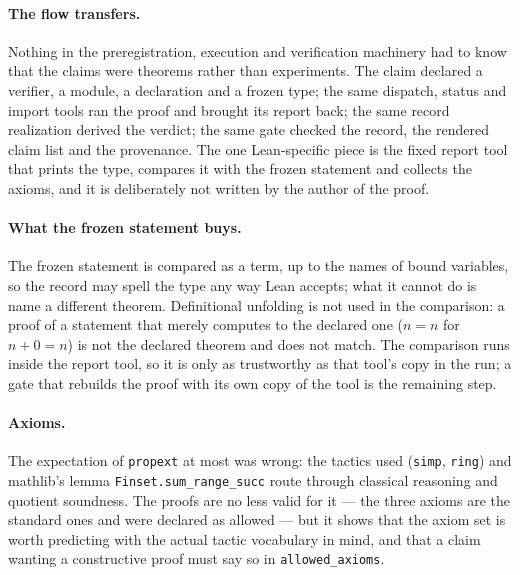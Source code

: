 \documentclass[journal,article,submit,pdftex,moreauthors]{Definitions/mdpi}
\begin{document}
\paragraph{The flow transfers.} Nothing in the preregistration, execution and verification machinery had to know that the claims were theorems rather than experiments. The claim declared a verifier, a module, a declaration and a frozen type; the same dispatch, status and import tools ran the proof and brought its report back; the same record realization derived the verdict; the same gate checked the record, the rendered claim list and the provenance. The one Lean-specific piece is the fixed report tool that prints the type, compares it with the frozen statement and collects the axioms, and it is deliberately not written by the author of the proof.

\paragraph{What the frozen statement buys.} The frozen statement is compared as a term, up to the names of bound variables, so the record may spell the type any way Lean accepts; what it cannot do is name a different theorem. Definitional unfolding is not used in the comparison: a proof of a statement that merely computes to the declared one (\(n = n\) for \(n + 0 = n\)) is not the declared theorem and does not match. The comparison runs inside the report tool, so it is only as trustworthy as that tool's copy in the run; a gate that rebuilds the proof with its own copy of the tool is the remaining step.

\paragraph{Axioms.} The expectation of \texttt{propext} at most was wrong: the tactics used (\texttt{simp}, \texttt{ring}) and mathlib's lemma \texttt{Finset.sum\_range\_succ} route through classical reasoning and quotient soundness. The proofs are no less valid for it --- the three axioms are the standard ones and were declared as allowed --- but it shows that the axiom set is worth predicting with the actual tactic vocabulary in mind, and that a claim wanting a constructive proof must say so in \texttt{allowed\_axioms}.
\end{document}
